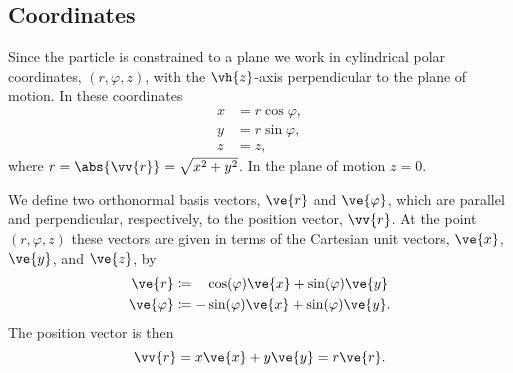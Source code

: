 \documentclass[fleqn]{NotesClass}
\begin{document}
    \subsection{Coordinates}
    Since the particle is constrained to a plane we work in cylindrical polar coordinates, \((r, \varphi, z)\), with the \(\vh{z}\)-axis perpendicular to the plane of motion.
    In these coordinates
    \begin{align}
        x &= r\cos\varphi,\\
        y &= r\sin\varphi,\\
        z &= z,
    \end{align}
    where \(r = \abs{\vv{r}} = \sqrt{x^2 + y^2}\).
    In the plane of motion \(z = 0\).
    
    We define two orthonormal basis vectors, \(\ve{r}\) and \(\ve{\varphi}\), which are parallel and perpendicular, respectively, to the position vector, \(\vv{r}\).
    At the point \((r, \varphi, z)\) these vectors are given in terms of the Cartesian unit vectors, \(\ve{x}\), \(\ve{y}\), and \(\ve{z}\), by
    \begin{align}
        \ve{r} &\coloneqq \hphantom{-}\cos(\varphi)\ve{x} + \sin(\varphi)\ve{y}\label{eqn:e_r definition}\\
        \ve{\varphi} &\coloneqq -\sin(\varphi)\ve{x} + \sin(\varphi)\ve{y}.
    \end{align}
    The position vector is then
    \begin{equation}
        \vv{r} = x\ve{x} + y\ve{y} = r\ve{r}.
    \end{equation}
    
\end{document}
